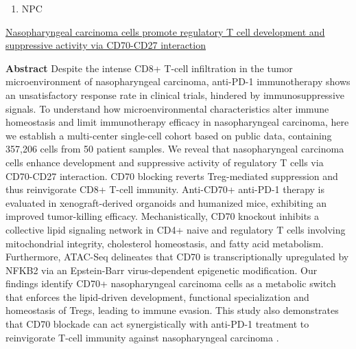 \documentclass[
]{book}
\providecommand{\tightlist}{%
  \setlength{\itemsep}{0pt}\setlength{\parskip}{0pt}}
\begin{document}
\begin{enumerate}
\def\labelenumi{\arabic{enumi}.}
\setcounter{enumi}{4}
\tightlist
\item
  NPC
\end{enumerate}

\href{https://www.nature.com/articles/s41467-023-37614-6}{Nasopharyngeal carcinoma cells promote regulatory T cell development and suppressive activity via CD70-CD27 interaction}

\textbf{Abstract}
Despite the intense CD8+ T-cell infiltration in the tumor microenvironment of nasopharyngeal carcinoma, anti-PD-1 immunotherapy shows an unsatisfactory response rate in clinical trials, hindered by immunosuppressive signals. To understand how microenvironmental characteristics alter immune homeostasis and limit immunotherapy efficacy in nasopharyngeal carcinoma, here we establish a multi-center single-cell cohort based on public data, containing 357,206 cells from 50 patient samples. We reveal that nasopharyngeal carcinoma cells enhance development and suppressive activity of regulatory T cells via CD70-CD27 interaction. CD70 blocking reverts Treg-mediated suppression and thus reinvigorate CD8+ T-cell immunity. Anti-CD70+ anti-PD-1 therapy is evaluated in xenograft-derived organoids and humanized mice, exhibiting an improved tumor-killing efficacy. Mechanistically, CD70 knockout inhibits a collective lipid signaling network in CD4+ naive and regulatory T cells involving mitochondrial integrity, cholesterol homeostasis, and fatty acid metabolism. Furthermore, ATAC-Seq delineates that CD70 is transcriptionally upregulated by NFKB2 via an Epstein-Barr virus-dependent epigenetic modification. Our findings identify CD70+ nasopharyngeal carcinoma cells as a metabolic switch that enforces the lipid-driven development, functional specialization and homeostasis of Tregs, leading to immune evasion. This study also demonstrates that CD70 blockade can act synergistically with anti-PD-1 treatment to reinvigorate T-cell immunity against nasopharyngeal carcinoma \citep{gong2023nasopharyngeal}.
\end{document}
